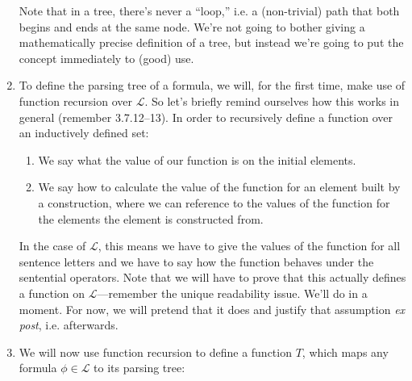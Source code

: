 \begin{enumerate}[\thesection.1]
\begin{itemize}
	\end{itemize}
Note that in a tree, there's never a ``loop,'' i.e. a (non-trivial) path that both begins and ends at the same node. We're not going to bother giving a mathematically precise definition of a tree, but instead we're going to put the concept immediately to (good) use.

	\item To define the parsing tree of a formula, we will, for the first time, make use of function recursion over $\mathcal{L}$. So let's briefly remind ourselves how this works in general (remember 3.7.12--13). In order to recursively define a function over an inductively defined set:
	
	\begin{enumerate}[1.]
		
			\item We say what the value of our function is on the initial elements.
			
			\item We say how to calculate the value of the function for an element built by a construction, where we can reference to the values of the function for the elements the element is constructed from.
		
		\end{enumerate}
	In the case of $\mathcal{L}$, this means we have to give the values of the function for all sentence letters and we have to say how the function behaves under the sentential operators. Note that we will have to prove that this actually defines a function on $\mathcal{L}$---remember the unique readability issue. We'll do in a moment. For now, we will pretend that it does and justify that assumption \emph{ex post}, i.e. afterwards.
	
	\item We will now use function recursion to define a function $T$, which maps any formula $\phi\in\mathcal{L}$ to its parsing tree:
	
\begin{center}
\end{center}


\end{enumerate}
